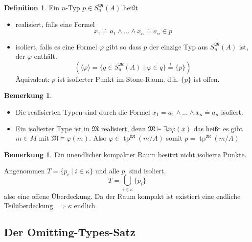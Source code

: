\documentclass[12pt,parskip=full]{scrartcl}
\theoremstyle{definition}
\newtheorem{definition}[theorem]{Definition}
\newtheorem{remark}[theorem]{Bemerkung}
\begin{document}
 	\begin{definition}
 		Ein $n$-Typ $p \in S_n^\mathfrak{M}(A)$ heißt
 		\begin{itemize}
 			\item realisiert, falls eine Formel
 			\begin{equation*}
	 			x_1 \doteq a_1 \land \dots \land x_n \doteq a_n \in p
 			\end{equation*}
 			\item isoliert, falls es eine Formel $\varphi$ gibt so dass $p$ der einzige Typ aus $S_n^\mathfrak{M}(A)$ ist, der $\varphi$ enthält.
 			\begin{equation*}
	 			\left( \langle \varphi \rangle = \{ q \in S_n^\mathfrak{M}(A) \mid \varphi \in q \} \overset{!}{=} \{ p \} \right)
 			\end{equation*}
 			Äquivalent: $p$ ist isolierter Punkt im Stone-Raum, d.h. $\{ p \}$ ist offen.
 		\end{itemize}
 	\end{definition}
 
 	\begin{remark}
 		\begin{itemize}
 			\item Die realisierten Typen sind durch die Formel $x_1 = a_1 \land \dots \land x_n \doteq a_n$ isoliert.
 			\item Ein isolierter Type ist in $\mathfrak{M}$ realisiert, denn $\mathfrak{M} \models \exists \overline{x} \varphi(\overline{x})$ das heißt es gibt $\overline{m} \in M$ mit $\mathfrak{M} \models \varphi(\overline{m})$. Also $\varphi \in \operatorname{tp}^\mathfrak{M}(\overline{m} / A)$ somit $p = \operatorname{tp}^\mathfrak{M}(\overline{m} / A)$
 		\end{itemize}
 	\end{remark}
 
 	\begin{remark}
 		Ein unendlicher kompakter Raum besitzt nicht isolierte Punkte.
 		
 		Angenommen $T = \{ p_i \mid i \in \kappa \}$ und alle $p_i$ sind isoliert.
 		\begin{equation*}
	 		T = \bigcup_{i \in \kappa} \{ p_i \}
 		\end{equation*}
 		also eine offene Überdeckung. Da der Raum kompakt ist existiert eine endliche Teilüberdeckung. $\Rightarrow \kappa$ endlich
 	\end{remark}
	
	\subsection{Der Omitting-Types-Satz}
	
\end{document}
